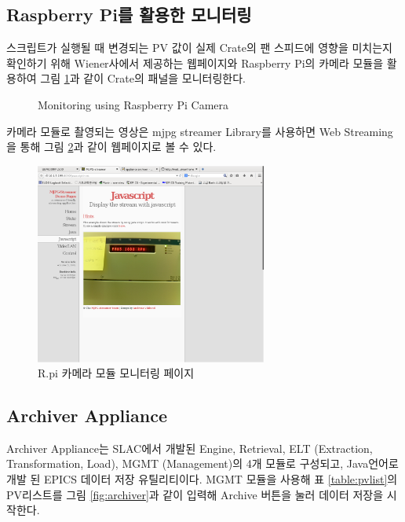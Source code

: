 \documentclass[11pt
  , a4paper
  , article
  , oneside
]{memoir}
\begin{document}
\subsection{Raspberry Pi를 활용한 모니터링}
스크립트가 실행될 때 변경되는 PV 값이 실제 Crate의 팬 스피드에 영향을 미치는지 확인하기 위해 Wiener사에서 제공하는 웹페이지와 Raspberry Pi의 카메라 모듈을 활용하여 그림 \ref{fig:rpimonitoring}과 같이 Crate의 패널을 모니터링한다.

\begin{figure}[!h]
  \centering
              \hfill
              \hfill
  \caption
      {
Monitoring using Raspberry Pi Camera
      }
 \label{fig:rpimonitoring}
\end{figure}

카메라 모듈로 촬영되는 영상은 mjpg streamer Library를 사용하면 Web Streaming을 통해 그림 \ref{fig:javapage}과 같이 웹페이지로 볼 수 있다. 

\begin{figure}[h!]
  \centering
  \includegraphics[width=0.68\textwidth]{./images/javapage.eps}
  \caption{R.pi 카메라 모듈 모니터링 페이지}
  \label{fig:javapage}   
\end{figure}

\clearpage


\subsection{Archiver Appliance}
Archiver Appliance는 SLAC에서 개발된 Engine, Retrieval, ELT (Extraction, Transformation, Load), MGMT (Management)의 4개 모듈로 구성되고, Java언어로 개발 된 EPICS 데이터 저장 유틸리티이다. MGMT 모듈을 사용해 표 \ref{table:pvlist}의 PV리스트를 그림 \ref{fig:archiver}과 같이 입력해 Archive 버튼을 눌러 데이터 저장을 시작한다. 
\end{document}
